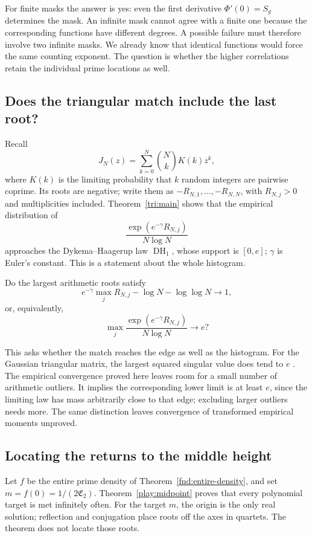 For finite masks the answer is yes: even the first derivative
$\Phi'(0)=S_g$ determines the mask.  An infinite mask cannot agree
with a finite one because the corresponding functions have different
degrees.  A possible failure must therefore involve two infinite
masks.  We already know that identical functions would force the
same counting exponent.  The question is whether the higher
correlations retain the individual prime locations as well.

\subsection{Does the triangular match include the last root?}

Recall
\[
 J_N(z)=\sum_{k=0}^N\binom Nk K(k)z^k,
\]
where $K(k)$ is the limiting probability that $k$ random integers
are pairwise coprime.  Its roots are negative; write them as
$-R_{N,1},\ldots,-R_{N,N}$, with $R_{N,j}>0$ and multiplicities
included.  Theorem~\ref{tri:main} shows that the empirical
distribution of
\[
 \frac{\exp(e^{-\gamma}R_{N,j})}{N\log N}
\]
approaches the Dykema--Haagerup law $\operatorname{DH}_1$, whose
support is $[0,e]$; $\gamma$ is Euler's constant.  This is a
statement about the whole histogram.

\begin{question}\label{tri:edgequestion}
Do the largest arithmetic roots satisfy
\[
 e^{-\gamma}\max_jR_{N,j}-\log N-\log\log N\longrightarrow1,
\]
or, equivalently,
\[
 \max_j\frac{\exp(e^{-\gamma}R_{N,j})}{N\log N}
 \longrightarrow e?
\]
\end{question}

This asks whether the match reaches the edge as well as the histogram.
For the Gaussian triangular matrix, the largest squared singular value
does tend to $e$ \cite[Theorem 2]{triCheliotis}.
The empirical convergence proved here leaves room for a small number
of arithmetic outliers.  It implies the corresponding lower limit is
at least $e$, since the limiting law has mass arbitrarily close to that
edge; excluding larger outliers needs more.
The same distinction leaves convergence of transformed empirical
moments unproved.

\subsection{Locating the returns to the middle height}

Let $f$ be the entire prime density of
Theorem~\ref{fnd:entire-density}, and set
$m=f(0)=1/(2\mathfrak C_2)$.
Theorem~\ref{play:midpoint} proves that every polynomial target is
met infinitely often.  For the target $m$, the origin is the only
real solution; reflection and conjugation place roots off the axes
in quartets.  The theorem does not locate those roots.

